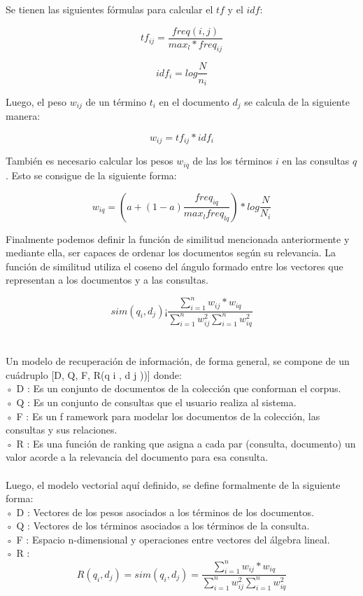 \documentclass[runningheads,a4paper]{llncs}
\begin{document}
Se tienen las siguientes fórmulas para calcular el $tf$ y el $idf$:

$$
tf_{ij} = \frac{freq(i,j)}{max_l * freq_{ij}}
$$

$$
idf_i = log \frac{N}{n_i}
$$

Luego, el peso $w_{ij}$ de un término $t_i$ en el documento $d_j$ se calcula de la siguiente manera:

$$
w_{ij} = tf_{ij} * idf_i
$$


También es necesario calcular los pesos $w_{iq}$ de las los términos $i$ en las consultas $q$. Esto se consigue de la siguiente forma:

$$
w_{iq} = (a + (1 - a)\frac{freq_{iq}}{max_l freq_{lq}}) * log\frac{N}{N_i}
$$

Finalmente podemos definir la función de similitud mencionada anteriormente y mediante ella, ser capaces de ordenar los documentos según su relevancia. La función de similitud utiliza el coseno del ángulo formado entre los vectores que representan a los documentos y a las consultas.

$$
sim(q_i, d_j) ¡ \frac{\sum_{i = 1}^{n}w_{ij} * w_{iq}}{\sum_{i = 1}^{n}w^2_{ij} \sum_{i = 1}^{n}w^2_{iq} }
$$\\\\


Un modelo de recuperación de información, de forma general, se compone de un cuádruplo [D, Q, F, R(q i , d j ))] donde:\\
◦ D : Es un conjunto de documentos de la colección que conforman el corpus.\\
◦ Q : Es un conjunto de consultas que el usuario realiza al sistema.\\
◦ F : Es un f ramework para modelar los documentos de la colección, las consultas
y sus relaciones.\\
◦ R : Es una función de ranking que asigna a cada par (consulta, documento) un
valor acorde a la relevancia del documento para esa consulta.\\\\

Luego, el modelo vectorial aquí definido, se define formalmente de la siguiente forma:\\
◦ D : Vectores de los pesos asociados a los términos de los documentos.\\
◦ Q : Vectores de los términos asociados a los términos de la consulta.\\
◦ F : Espacio n-dimensional y operaciones entre vectores del álgebra lineal.\\
◦ R : $$ R(q_i, d_j) =
sim(q_i, d_j) = \frac{\sum_{i = 1}^{n}w_{ij} * w_{iq}}{\sum_{i = 1}^{n}w^2_{ij} \sum_{i = 1}^{n}w^2_{iq} }
$$
\end{document}
